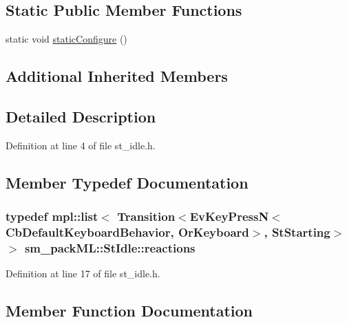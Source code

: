 \subsection*{Static Public Member Functions}
\begin{DoxyCompactItemize}
\item 
static void \hyperlink{structsm__packML_1_1StIdle_a946ecb6d3aeee4886ea37640ec630385}{static\+Configure} ()
\end{DoxyCompactItemize}
\subsection*{Additional Inherited Members}


\subsection{Detailed Description}


Definition at line 4 of file st\+\_\+idle.\+h.



\subsection{Member Typedef Documentation}
\subsubsection[{\texorpdfstring{reactions}{reactions}}]{\setlength{\rightskip}{0pt plus 5cm}typedef mpl\+::list$<$ Transition$<$Ev\+Key\+PressN$<$Cb\+Default\+Keyboard\+Behavior, {\bf Or\+Keyboard}$>$, {\bf St\+Starting}$>$ $>$ {\bf sm\+\_\+pack\+M\+L\+::\+St\+Idle\+::reactions}}\hypertarget{structsm__packML_1_1StIdle_a5b61a5e6d7cd41d7e53d4e3a89a53c6a}{}\label{structsm__packML_1_1StIdle_a5b61a5e6d7cd41d7e53d4e3a89a53c6a}


Definition at line 17 of file st\+\_\+idle.\+h.



\subsection{Member Function Documentation}
